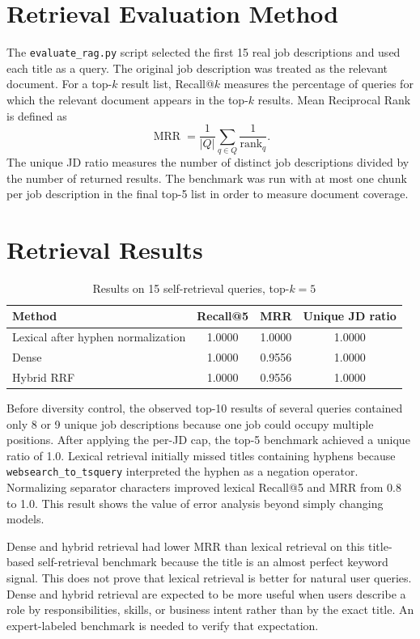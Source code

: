 \documentclass[12pt,a4paper,oneside]{report}
\newcommand{\code}[1]{\texttt{#1}}
\begin{document}
\section{Retrieval Evaluation Method}
The \code{evaluate\_rag.py} script selected the first 15 real job descriptions and used each title as a query. The original job description was treated as the relevant document. For a top-$k$ result list, Recall@$k$ measures the percentage of queries for which the relevant document appears in the top-$k$ results. Mean Reciprocal Rank is defined as
\begin{equation}
\operatorname{MRR}=\frac{1}{|Q|}\sum_{q\in Q}\frac{1}{\operatorname{rank}_q}.
\label{eq:mrr}
\end{equation}
The unique JD ratio measures the number of distinct job descriptions divided by the number of returned results. The benchmark was run with at most one chunk per job description in the final top-5 list in order to measure document coverage.

\section{Retrieval Results}
\begin{table}[H]
\centering
\caption{Results on 15 self-retrieval queries, top-$k=5$}
\label{tab:retrieval-result}
\begin{tabular}{lccc}
\toprule
\textbf{Method} & \textbf{Recall@5} & \textbf{MRR} & \textbf{Unique JD ratio}\\
\midrule
Lexical after hyphen normalization & 1.0000 & 1.0000 & 1.0000\\
Dense & 1.0000 & 0.9556 & 1.0000\\
Hybrid RRF & 1.0000 & 0.9556 & 1.0000\\
\bottomrule
\end{tabular}
\end{table}

Before diversity control, the observed top-10 results of several queries contained only 8 or 9 unique job descriptions because one job could occupy multiple positions. After applying the per-JD cap, the top-5 benchmark achieved a unique ratio of 1.0. Lexical retrieval initially missed titles containing hyphens because \code{websearch\_to\_tsquery} interpreted the hyphen as a negation operator. Normalizing separator characters improved lexical Recall@5 and MRR from 0.8 to 1.0. This result shows the value of error analysis beyond simply changing models.

Dense and hybrid retrieval had lower MRR than lexical retrieval on this title-based self-retrieval benchmark because the title is an almost perfect keyword signal. This does not prove that lexical retrieval is better for natural user queries. Dense and hybrid retrieval are expected to be more useful when users describe a role by responsibilities, skills, or business intent rather than by the exact title. An expert-labeled benchmark is needed to verify that expectation.
\end{document}
